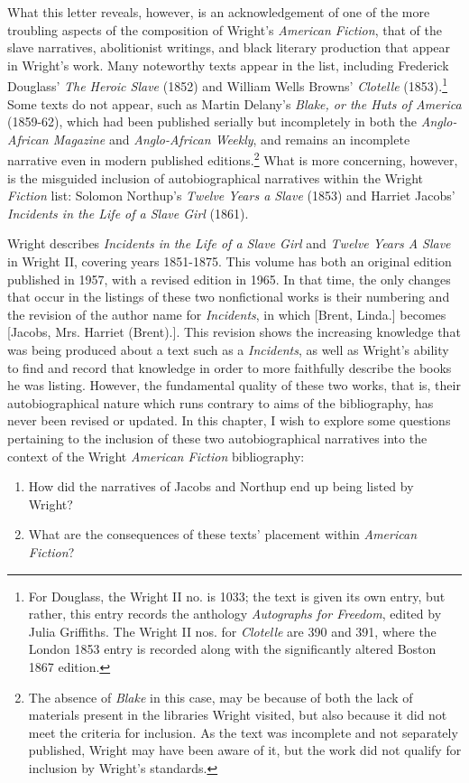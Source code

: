 What this letter reveals, however, is an acknowledgement of one of the more troubling aspects of the composition of Wright's \textit{American Fiction}, that of the slave narratives, abolitionist writings, and black literary production that appear in Wright's work. Many noteworthy texts appear in the list, including Frederick Douglass' \textit{The Heroic Slave} (1852) and William Wells Browns' \textit{Clotelle} (1853).\footnote{For Douglass, the Wright II no. is 1033; the text is given its own entry, but rather, this entry records the anthology \textit{Autographs for Freedom}, edited by Julia Griffiths. The Wright II nos. for \textit{Clotelle} are 390 and 391, where the London 1853 entry is recorded along with the significantly altered Boston 1867 edition.} Some texts do not appear, such as Martin Delany's \textit{Blake, or the Huts of America} (1859-62), which had been published serially but incompletely in both the \textit{Anglo-African Magazine} and \textit{Anglo-African Weekly}, and remains an incomplete narrative even in modern published editions.\footnote{The absence of \textit{Blake} in this case, may be because of both the lack of materials present in the libraries Wright visited, but also because it did not meet the criteria for inclusion. As the text was incomplete and not separately published, Wright may have been aware of it, but the work did not qualify for inclusion by Wright's standards.} What is more concerning, however, is the misguided inclusion of autobiographical narratives within the Wright \textit{Fiction} list: Solomon Northup's \textit{Twelve Years a Slave} (1853) and Harriet Jacobs' \textit{Incidents in the Life of a Slave Girl} (1861). 

Wright describes \textit{Incidents in the Life of a Slave Girl} and \textit{Twelve Years A Slave} in Wright II, covering years 1851-1875. This volume has both an original edition published in 1957, with a revised edition in 1965. In that time, the only changes that occur in the listings of these two nonfictional works is their numbering and the revision of the author name for \textit{Incidents}, in which [Brent, Linda.] becomes [Jacobs, Mrs. Harriet (Brent).]. This revision shows the increasing knowledge that was being produced about a text such as a \textit{Incidents}, as well as Wright's ability to find and record that knowledge in order to more faithfully describe the books he was listing. However, the fundamental quality of these two works, that is, their autobiographical nature which runs contrary to aims of the bibliography, has never been revised or updated. In this chapter, I wish to explore some questions pertaining to the inclusion of these two autobiographical narratives into the context of the Wright \textit{American Fiction} bibliography: 
\begin{enumerate}
\item How did the narratives of Jacobs and Northup end up being listed by Wright?
\item What are the consequences of these texts' placement within \textit{American Fiction}?
\end{enumerate}

